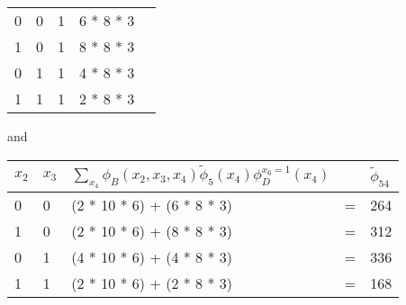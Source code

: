 \begin{exenumerate}
\begin{solution}
\begin{center}
\begin{tabular}{lllll}
          0 & 0 & 1 & 6 * 8 * 3 \\
          1 & 0 & 1 & 8 * 8 * 3 \\
          0 & 1 & 1 & 4 * 8 * 3 \\
          1 & 1 & 1 & 2 * 8 * 3 \\
          \bottomrule
        \end{tabular}
      \end{center}
    and
    \begin{center}
      \begin{tabular}{lllll}
        \toprule
        $x_2$ & $x_3$ & $\sum_{x_4} \phi_B(x_2, x_3, x_4) \tilde{\phi}_5(x_4) \phi_D^{x_6=1}(x_4)$ &  & $\tilde{\phi}_{54}$\\
        \midrule
        0 & 0 & (2 * 10 * 6) + (6 * 8 * 3) & = & 264 \\
        1 & 0 & (2 * 10 * 6) + (8 * 8 * 3) & = & 312 \\
        0 & 1 & (4 * 10 * 6) + (4 * 8 * 3) & = & 336 \\
        1 & 1 & (2 * 10 * 6) + (2 * 8 * 3) & = & 168 \\
        \bottomrule
      \end{tabular}
    \end{center}


\end{solution}
\end{exenumerate}
